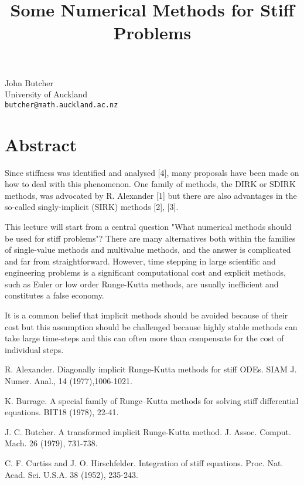 \title{Some Numerical Methods for Stiff Problems}
\author{}
 \institute{}
\maketitle
\begin{center}
{\large John Butcher}\\
University of Auckland\\
{\tt butcher@math.auckland.ac.nz}

\end{center}

\section*{Abstract}

Since stiffness was identified and analysed [4], many proposals have been made on how to deal with this phenomenon. One family of methods, the  DIRK or SDIRK methods, was advocated by R. Alexander [1] but there are also advantages in the so-called singly-implicit (SIRK) methods [2], [3].

This lecture will start from a central question "What numerical methods should be used for stiff problems"?  There are many alternatives both within the families of single-value methods and multivalue methods, and the answer is complicated and far from straightforward.  However, time stepping in large scientific and engineering problems is a significant computational cost and explicit methods, such as Euler or low order Runge-Kutta methods, are usually inefficient and constitutes a false economy.

It is a common belief that implicit methods should be avoided because of their cost but this assumption should be challenged because highly stable methods can take large time-steps and this can often more than compensate for the cost of individual steps.



\begin{thebibliography}{10}

{\sc R. Alexander}. {Diagonally implicit Runge-Kutta methods for stiff ODEs}. SIAM J. Numer. Anal., 14 (1977),1006-1021.



{\sc K. Burrage}. {A special family of Runge--Kutta methods for solving stiff differential equations}. BIT18 (1978), 22-41.



{\sc J. C. Butcher}. {A transformed implicit Runge-Kutta method}. J. Assoc. Comput. Mach. 26 (1979), 731-738.



{\sc C. F. Curtiss and J. O. Hirschfelder}. {Integration of stiff equations}. Proc. Nat. Acad. Sci. U.S.A. 38 (1952), 235-243.

\end{thebibliography}
